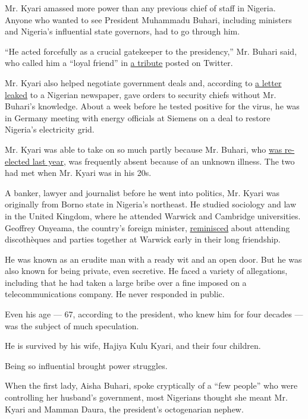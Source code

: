 Mr. Kyari amassed more power than any previous chief of staff in
Nigeria. Anyone who wanted to see President Muhammadu Buhari, including
ministers and Nigeria's influential state governors, had to go through
him.

``He acted forcefully as a crucial gatekeeper to the presidency,'' Mr.
Buhari said, who called him a ``loyal friend'' in
\href{https://twitter.com/MBuhari/status/1251567643909337089}{a tribute}
posted on Twitter.

Mr. Kyari also helped negotiate government deals and, according to
\href{https://www.premiumtimesng.com/news/headlines/377757-updated-exclusive-buharis-team-in-disarray-as-nsa-monguno-declares-war-on-abba-kyari.html}{a
letter leaked} to a Nigerian newspaper, gave orders to security chiefs
without Mr. Buhari's knowledge. About a week before he tested positive
for the virus, he was in Germany meeting with energy officials at
Siemens on a deal to restore Nigeria's electricity grid.

Mr. Kyari was able to take on so much partly because Mr. Buhari, who
\href{https://www.nytimes.com/2019/02/26/world/africa/nigeria-election-results.html}{was
re-elected last year}, was frequently absent because of an unknown
illness. The two had met when Mr. Kyari was in his 20s.

A banker, lawyer and journalist before he went into politics, Mr. Kyari
was originally from Borno state in Nigeria's northeast. He studied
sociology and law in the United Kingdom, where he attended Warwick and
Cambridge universities. Geoffrey Onyeama, the country's foreign
minister,
\href{https://www.youtube.com/watch?v=j_Q3uGqR3-s\&feature=youtu.be}{reminisced}
about attending discothèques and parties together at Warwick early in
their long friendship.

He was known as an erudite man with a ready wit and an open door. But he
was also known for being private, even secretive. He faced a variety of
allegations, including that he had taken a large bribe over a fine
imposed on a telecommunications company. He never responded in public.

Even his age --- 67, according to the president, who knew him for four
decades --- was the subject of much speculation.

He is survived by his wife, Hajiya Kulu Kyari, and their four children.

Being so influential brought power struggles.

When the first lady, Aisha Buhari, spoke cryptically of a ``few people''
who were controlling her husband's government, most Nigerians thought
she meant Mr. Kyari and Mamman Daura, the president's octogenarian
nephew.

